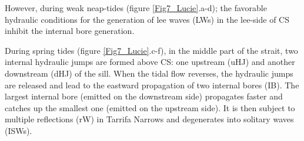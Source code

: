 \vspace{\baselineskip}
However, during weak neap-tides (figure \ref{Fig7_Lucie}.a-d); the favorable hydraulic conditions for the generation of lee waves (LWs) in the lee-side of CS inhibit the internal bore generation.  \par


\vspace{\baselineskip}
During spring tides (figure \ref{Fig7_Lucie}.c-f), in the middle part of the strait, two internal hydraulic jumps are formed above CS: one upstream (uHJ) and another downstream (dHJ) of the sill. When the tidal flow reverses, the hydraulic jumps are released and lead to the eastward propagation of two internal bores (IB). The largest internal bore (emitted on the downstream side) propagates faster and catches up the smallest one (emitted on the upstream side). It is then subject to multiple reflections (rW) in Tarrifa Narrows and degenerates into solitary waves (ISWs).\par

\vspace{\baselineskip}

\vspace{\baselineskip}

\vspace{\baselineskip}



